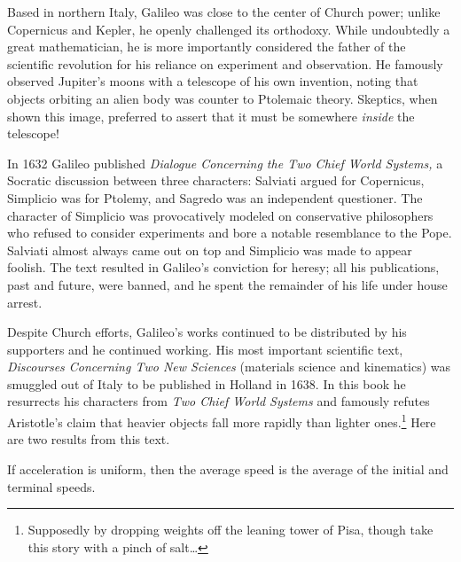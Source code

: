 
Based in northern Italy, Galileo was close to the center of Church power; unlike Copernicus and Kepler, he openly challenged its orthodoxy. While undoubtedly a great mathematician, he is more importantly considered the father of the scientific revolution for his reliance on experiment and observation. He famously observed Jupiter's moons with a telescope of his own invention, noting that objects orbiting an alien body was counter to Ptolemaic theory. Skeptics, when shown this image, preferred to assert that it must be somewhere \emph{inside} the telescope!\smallbreak

In 1632 Galileo published \emph{Dialogue Concerning the Two Chief World Systems,} a Socratic discussion between three characters: Salviati argued for Copernicus, Simplicio was for Ptolemy, and Sagredo was an independent questioner. The character of Simplicio was provocatively modeled on conservative philosophers who refused to consider experiments and bore a notable resemblance to the Pope. Salviati almost always came out on top and Simplicio was made to appear foolish. The text resulted in Galileo's conviction for heresy; all his publications, past and future, were banned, and he spent the remainder of his life under house arrest.\smallbreak

Despite Church efforts, Galileo's works continued to be distributed by his supporters and he continued working. His most important scientific text, \emph{Discourses Concerning Two New Sciences} (materials science and kinematics) was smuggled out of Italy to be published in Holland in 1638. In this book he resurrects his characters from \emph{Two Chief World Systems} and famously refutes Aristotle's claim that heavier objects fall more rapidly than lighter ones.\footnote{Supposedly by dropping weights off the leaning tower of Pisa, though take this story with a pinch of salt\ldots} Here are two results from this text.

\begin{thm*}{}{}
	If acceleration is uniform, then the average speed is the average of the initial and terminal speeds.
\end{thm*}
\label{pg:galileo}

